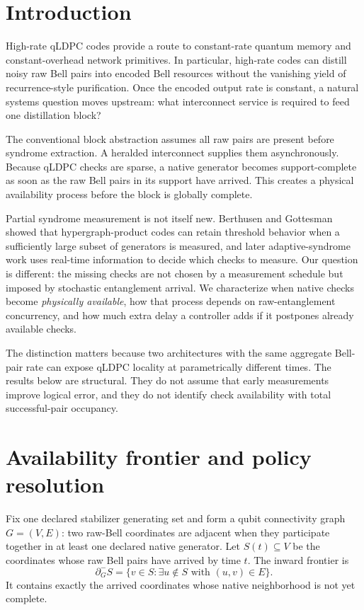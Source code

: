 \documentclass[aps,prx,reprint,superscriptaddress,nofootinbib,longbibliography,floatfix]{revtex4-2}
\begin{document}
\section{Introduction}
High-rate qLDPC codes provide a route to constant-rate quantum memory and constant-overhead network primitives. In particular, high-rate codes can distill noisy raw Bell pairs into encoded Bell resources without the vanishing yield of recurrence-style purification. Once the encoded output rate is constant, a natural systems question moves upstream: what interconnect service is required to feed one distillation block?

The conventional block abstraction assumes all raw pairs are present before syndrome extraction. A heralded interconnect supplies them asynchronously. Because qLDPC checks are sparse, a native generator becomes support-complete as soon as the raw Bell pairs in its support have arrived. This creates a physical availability process before the block is globally complete.

Partial syndrome measurement is not itself new. Berthusen and Gottesman showed that hypergraph-product codes can retain threshold behavior when a sufficiently large subset of generators is measured, and later adaptive-syndrome work uses real-time information to decide which checks to measure. Our question is different: the missing checks are not chosen by a measurement schedule but imposed by stochastic entanglement arrival. We characterize when native checks become \emph{physically available}, how that process depends on raw-entanglement concurrency, and how much extra delay a controller adds if it postpones already available checks.

The distinction matters because two architectures with the same aggregate Bell-pair rate can expose qLDPC locality at parametrically different times. The results below are structural. They do not assume that early measurements improve logical error, and they do not identify check availability with total successful-pair occupancy.

\section{Availability frontier and policy resolution}
Fix one declared stabilizer generating set and form a qubit connectivity graph $G=(V,E)$: two raw-Bell coordinates are adjacent when they participate together in at least one declared native generator. Let $S(t)\subseteq V$ be the coordinates whose raw Bell pairs have arrived by time $t$. The inward frontier is
\begin{equation}
\partial_G^-S=\{v\in S:\exists u\notin S\text{ with }(u,v)\in E\}.
\end{equation}
It contains exactly the arrived coordinates whose native neighborhood is not yet complete.
\end{document}
